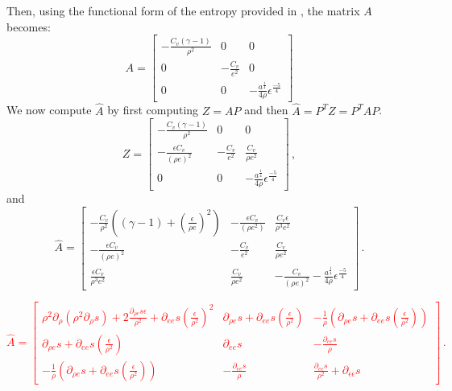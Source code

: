 \documentclass[times,doublespace]{fldauth}%
\newcommand{\sdd}{\ensuremath{\rho^2\partial_{\rho}(\rho^2 \partial_{\rho} s)}}
\newcommand{\sde}{\ensuremath{\partial_{\rho e} s}}
\newcommand{\see}{\ensuremath{\partial_{e e} s}}
\newcommand{\srr}{\ensuremath{\partial_{\epsilon \epsilon} s}}
\begin{document}
%
Then, using the functional form of the entropy provided in , the matrix $A$ becomes:
%
\begin{equation}
A = 
\begin{bmatrix}
-\frac{C_v (\gamma-1)}{\rho^2} & 0 & 0 \\
0 & -\frac{C_v}{e^2} & 0 \\
0 & 0 & -\frac{a^\frac{1}{4}}{4\rho}\epsilon^\frac{-5}{4}
\end{bmatrix}
\end{equation}
%
We now compute $\hat{A}$ by first computing $Z=AP$ and then $\hat{A} = P^T Z = P^T A P$.
%
\begin{equation}
Z = 
\begin{bmatrix}
-\frac{C_v (\gamma-1)}{\rho^2} & 0 & 0 \\
-\frac{\epsilon C_v}{(\rho e)^2} & -\frac{C_v}{e^2} & \frac{C_v}{\rho e^2} \\
0 & 0 & -\frac{a^\frac{1}{4}}{4\rho}\epsilon^\frac{-5}{4}
\end{bmatrix} \, ,
\end{equation}
%
and 
%
\begin{equation}
\hat{A} = 
\begin{bmatrix}
-\frac{C_v}{\rho^2} \left((\gamma-1)+\left(\frac{\epsilon}{\rho e}\right)^2\right) & -\frac{\epsilon C_v}{(\rho e^2)} & \frac{C_v \epsilon}{\rho^3 e^2} \\
-\frac{\epsilon C_v}{(\rho e)^2} & -\frac{C_v}{e^2} & \frac{C_v}{\rho e^2} \\
\frac{\epsilon C_v}{\rho^3 e^2} & \frac{C_v}{\rho e^2} & -\frac{C_v}{(\rho e)^2}-\frac{a^\frac{1}{4}}{4\rho}\epsilon^\frac{-5}{4}
\end{bmatrix} \, .
\end{equation}

\textcolor{red}{
\begin{equation}
\hat{A} = 
\begin{bmatrix}
\sdd + 2\frac{\sde \epsilon}{\rho^2} + \see \left(\frac{\epsilon}{\rho^2}\right)^2 &
\sde  + \see \left(\frac{\epsilon}{\rho^2}\right) &
-\frac{1}{\rho} \left( \sde  + \see \left(\frac{\epsilon}{\rho^2}\right) \right) \\
\sde  + \see \left(\frac{\epsilon}{\rho^2}\right) &
\see &
-\frac{\see}{\rho} \\
-\frac{1}{\rho} \left( \sde  + \see \left(\frac{\epsilon}{\rho^2}\right) \right) &
-\frac{\see}{\rho} &
\frac{\see}{\rho^2} + \srr
\end{bmatrix} \, .
\end{equation}
}
\end{document}

